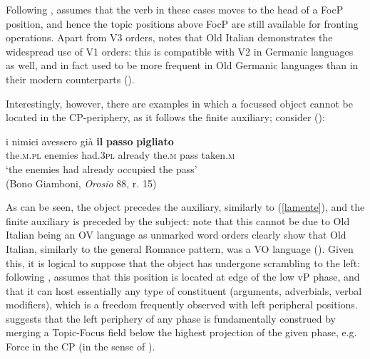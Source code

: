 Following \citet{beninca2006}, \citet[263]{poletto2006} assumes that the verb in these cases moves to the head of a FocP position, and hence the topic positions above FocP are still available for fronting operations. Apart from V3 orders, \citet[263--264]{poletto2006} notes that Old Italian demonstrates the widespread use of V1 orders: this is compatible with V2 in Germanic languages as well, and in fact used to be more frequent in Old Germanic languages than in their modern counterparts (\citealt{fuss2005diss}).

Interestingly, however, there are examples in which a focussed object cannot be located in the CP-periphery, as it follows the finite auxiliary; consider (\citealt[264, ex. 7a]{poletto2006}):

\ea \gll i nimici avessero già \textbf{il} \textbf{passo} \textbf{pigliato} \label{ilpasso}\\
the.\textsc{m.pl} enemies had.\textsc{3pl} already the.\textsc{m} pass taken.\textsc{m}\\
\glt `the enemies had already occupied the pass'\\(Bono Giamboni, \textit{Orosio} 88, r. 15)
\z

As can be seen, the object precedes the auxiliary, similarly to (\ref{lamente}), and the finite auxiliary is preceded by the subject: note that this cannot be due to Old Italian being an OV language as unmarked word orders clearly show that Old Italian, similarly to the general Romance pattern, was a VO language (\citealt[265]{poletto2006}). Given this, it is logical to suppose that the object has undergone scrambling to the left: following \citet{belletti2004}, \citet[267]{poletto2006} assumes that this position is located at edge of the low vP phase, and that it can host essentially any type of constituent (arguments, adverbials, verbal modifiers), which is a freedom frequently observed with left peripheral positions. \citet[267]{poletto2006} suggests that the left periphery of any phase is fundamentally construed by merging a Topic-Focus field below the highest projection of the given phase, e.g. Force in the CP (in the sense of \citealt{rizzi1997}).

